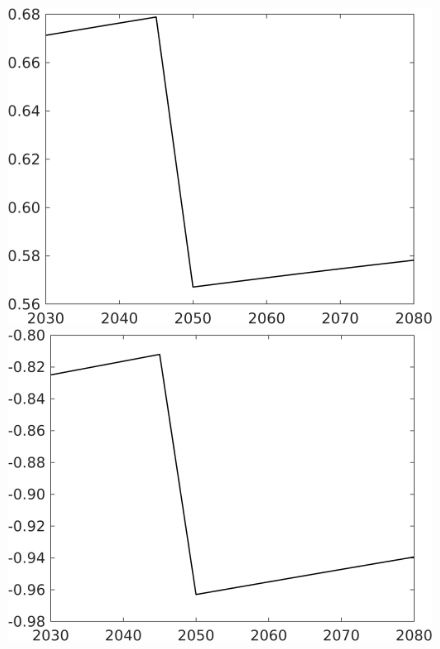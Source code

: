 \begin{figure}[h!!]
\begin{minipage}[]{0.32\textwidth}
\end{minipage}
	\begin{minipage}[]{0.32\textwidth}
	\includegraphics[width=1\textwidth]{../../codding_model/own_basedOnFried/optimalPol_elastS_DisuSci/figures/all_1705/Single_OPT_T_NoTaus_C_spillover0_sep1_etaa1.00.png}
\end{minipage}
\begin{minipage}[]{0.32\textwidth}
	\includegraphics[width=1\textwidth]{../../codding_model/own_basedOnFried/optimalPol_elastS_DisuSci/figures/all_1705/Single_OPT_T_NoTaus_SWF_spillover0_sep1_etaa1.00.png}

\end{minipage}
\end{figure}
